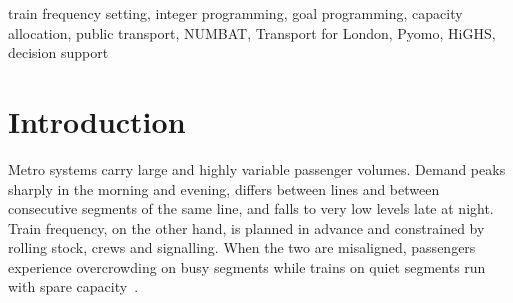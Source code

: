\documentclass[conference]{IEEEtran}
\begin{document}
\begin{abstract}
Urban metro demand varies strongly across the day and across the network, while train frequencies are fixed by
timetables. This paper presents a data-driven decision-support system that uses Transport for London's NUMBAT
open data to (i)~profile and validate link-level passenger loads and scheduled train frequencies, and (ii)~solve three
Operations Research models: an integer program for the minimum train frequency that carries observed demand, a
two-stage mixed-integer program that allocates a limited link-service budget to maximise demand served, and a
weighted goal program that balances operating effort, demand satisfaction, adherence to the existing service pattern
and a target capacity utilisation. The NUMBAT 2025 workbook yields \NObs{} link--interval observations
(\NLinks{} links, \NLines{} lines, \NIntervals{} quarter-hours). A consistency check between the two link sheets finds
\ZeroObs{} observations (\ZeroDemandPct\% of demand) where passengers are reported on a link with zero scheduled trains;
these are flagged and handled by an explicit, user-selectable policy. With published rolling-stock capacities and an
\Rho\% utilisation target, the minimum-frequency model needs \NetMOneReductionPct\% fewer link-train allocations than
the timetable network-wide, showing that observed frequencies are set by headway standards rather than by volume alone.
Scenario analysis quantifies the effect of 10--20\% demand growth, reduced service budgets and alternative
utilisation targets. The models are implemented in Pyomo with the HiGHS solver and delivered through an interactive
Streamlit dashboard.
\end{abstract}

\begin{IEEEkeywords}
train frequency setting, integer programming, goal programming, capacity allocation, public transport, NUMBAT,
Transport for London, Pyomo, HiGHS, decision support
\end{IEEEkeywords}

\section{Introduction}
Metro systems carry large and highly variable passenger volumes. Demand peaks sharply in the morning and evening,
differs between lines and between consecutive segments of the same line, and falls to very low levels late at night.
Train frequency, on the other hand, is planned in advance and constrained by rolling stock, crews and signalling.
When the two are misaligned, passengers experience overcrowding on busy segments while trains on quiet segments
run with spare capacity~\cite{ceder2016,ibarra2015}.
\end{document}
